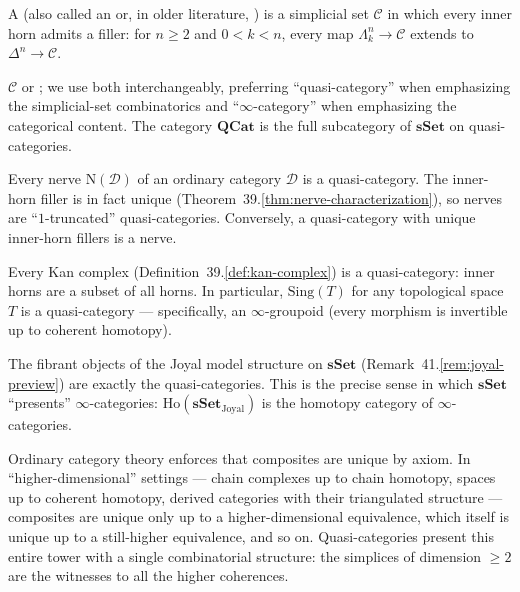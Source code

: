 \begin{definition}
\label{def:quasi-category}
A  (also called an  or, in
older literature, ) is a simplicial set
$\mathcal{C}$ in which every inner horn admits a filler: for $n \geq 2$
and $0 < k < n$, every map $\Lambda^n_k \to \mathcal{C}$ extends to
$\Delta^n \to \mathcal{C}$.
\end{definition}

\begin{howtosay}
$\mathcal{C}$  or
; we use both interchangeably,
preferring ``quasi-category'' when emphasizing the simplicial-set
combinatorics and ``$\infty$-category'' when emphasizing the categorical
content. The category $\mathbf{QCat}$ is the full subcategory of
$\mathbf{sSet}$ on quasi-categories.
\end{howtosay}

\begin{example_thm}
\label{ex:nerves-quasi}
Every nerve $\mathrm{N}(\mathcal{D})$ of an ordinary category $\mathcal{D}$
is a quasi-category. The inner-horn filler is in fact unique
(Theorem~39.\ref{thm:nerve-characterization}), so nerves are
``$1$-truncated'' quasi-categories. Conversely, a quasi-category with
unique inner-horn fillers is a nerve.
\end{example_thm}

\begin{example_thm}
\label{ex:kan-quasi}
Every Kan complex (Definition~39.\ref{def:kan-complex}) is a
quasi-category: inner horns are a subset of all horns. In particular,
$\mathrm{Sing}(T)$ for any topological space $T$ is a quasi-category —
specifically, an $\infty$-groupoid (every morphism is invertible up to
coherent homotopy).
\end{example_thm}

\begin{example_thm}
\label{ex:joyal-fibrant}
The fibrant objects of the Joyal model structure on $\mathbf{sSet}$
(Remark~41.\ref{rem:joyal-preview}) are exactly the quasi-categories.
This is the precise sense in which $\mathbf{sSet}$ ``presents''
$\infty$-categories: $\mathrm{Ho}(\mathbf{sSet}_{\mathrm{Joyal}})$ is
the homotopy category of $\infty$-categories.
\end{example_thm}

\begin{remark}
Ordinary category theory enforces that composites are unique by axiom.
In ``higher-dimensional'' settings — chain complexes up to chain homotopy,
spaces up to coherent homotopy, derived categories with their triangulated
structure — composites are unique only up to a higher-dimensional
equivalence, which itself is unique up to a still-higher equivalence,
and so on. Quasi-categories present this entire tower with a single
combinatorial structure: the simplices of dimension $\geq 2$ are the
witnesses to all the higher coherences.
\end{remark}


